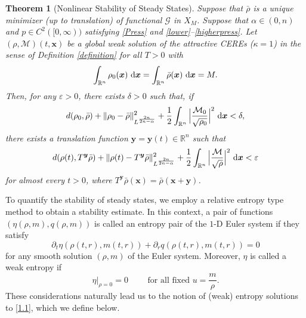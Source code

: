 \documentclass[reqno,11pt]{amsart}
\numberwithin{equation}{section}
\newcommand{\R}{\mathbb{R}}
\newtheorem{theorem}{Theorem}[section]
\theoremstyle{definition}
\def\v{\varepsilon}
\def\dd{{\, \rm d}}
\begin{document}
\begin{theorem}[Nonlinear Stability of Steady States]\label{ns}
Suppose that $\bar{\rho}$ is a unique minimizer {\rm(}up to translation{\rm)} 
of functional $\mathcal{G}$ in $X_M$. 
Suppose that $\alpha \in (0,n)$ and $p \in C^2([0,\infty))$ satisfying \eqref{Press}
and \eqref{lower}--\eqref{higherpress}. 
Let $(\rho,\mathcal{M})(t,\boldsymbol{x})$ be a global weak solution of 
the attractive CEREs {\rm (}$\kappa = 1${\rm )} in the sense of {\rm Definition {\ref{definition}}} for all $T>0$ with
$$\int_{\R^n} \rho_0(\boldsymbol{x})\,\dd \boldsymbol{x}=\int_{\R^n}  \bar{\rho}(\boldsymbol{x})\,\dd \boldsymbol{x}=M.$$
Then, for any $\v>0$, there exists $\delta>0$ such that, if
\begin{align*}
d(\rho_0,\bar{\rho})+ \| \rho_0 - \bar{\rho} \|_{L^\frac{2n}{2n - \alpha}}^2+\frac{1}{2}\int_{\R^n} \Big|\frac{\mathcal{M}_0}{\sqrt{\rho_0}}\Big|^2\,\dd \boldsymbol{x}<\delta,
\end{align*}
there exists a translation function $\boldsymbol{y}=\boldsymbol{y}(t)\in \R^n$ such that
\begin{align*}
d(\rho(t),T^{\boldsymbol{y}}\bar{\rho})+ \| \rho(t) - T^{\boldsymbol{y}}\bar{\rho} \|_{L^{\frac{2n}{2n - \alpha}}}^2+\frac{1}{2}\int_{\R^n} \Big|\frac{\mathcal{M}}{\sqrt{\rho}}\Big|^2\,\dd\boldsymbol{x}<\v
\end{align*}
for almost every $t>0$, where $T^{\boldsymbol{y}}\bar{\rho}(\boldsymbol{x})=\bar{\rho}(\boldsymbol{x}+\boldsymbol{y})$.
\end{theorem}

To quantify the stability of steady states, we employ 
a relative entropy type method to obtain a stability estimate. In this context, 
a pair of functions $(\eta(\rho,m),q(\rho,m))$ is called an entropy pair of the $1$-D 
Euler system if they satisfy
\begin{equation*}
\partial_t \eta(\rho(t,r),m(t,r)) + \partial_r q(\rho(t,r),m(t,r)) = 0
\end{equation*}
for any smooth solution $(\rho,m)$ of the Euler system. 
Moreover, $\eta$ is called a weak entropy if
\begin{equation*}
\eta|_{\rho = 0}=0 \qquad \text{ for all fixed $u = \frac{m}{\rho}$}.
\end{equation*}
These considerations naturally lead us to the notion of 
(weak) entropy solutions to \eqref{1.1}, which we define below.
\end{document}
